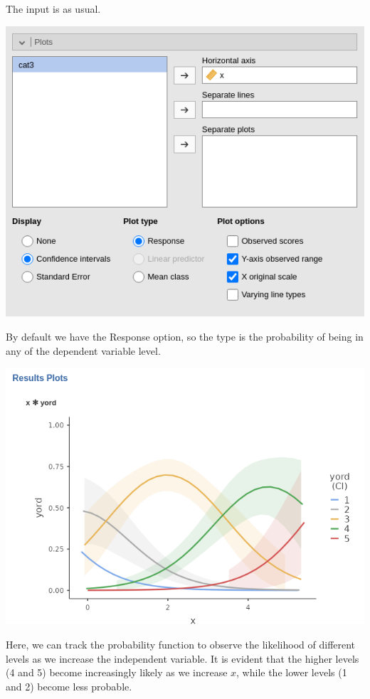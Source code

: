 \documentclass[
]{book}
\begin{document}
The input is as usual.

\includegraphics{bookletpics/3_ordinal_input3.png}

By default we have the {Response} option, so the type is the probability of being in any of the dependent variable level.

\includegraphics{bookletpics/3_ordinal_plot1.png}

Here, we can track the probability function to observe the likelihood of different levels as we increase the independent variable. It is evident that the higher levels (4 and 5) become increasingly likely as we increase \(x\), while the lower levels (1 and 2) become less probable.
\end{document}
